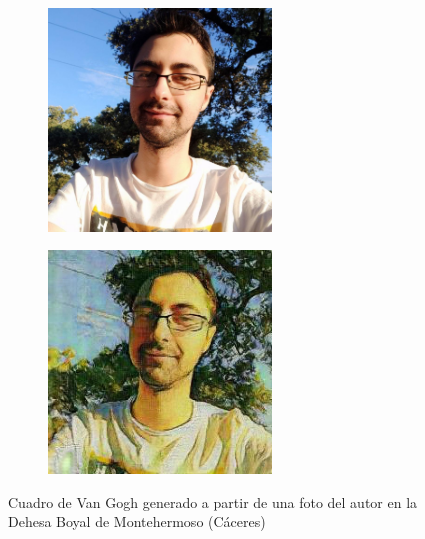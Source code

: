 \documentclass[[../main.tex]{subfiles}
\begin{document}
        \begin{figure}[!htb]
            \begin{subfigure}[b]{0.49\textwidth}
            \includegraphics[width=0.65\textwidth]{imagenes/imagen2cuadro/propias/vangogh/photo_2020-07-01_21-19-51.jpg}
            \end{subfigure}
        \hfill
            \begin{subfigure}[b]{0.49\textwidth}
            \includegraphics[width=0.65\textwidth]{imagenes/imagen2cuadro/propias/vangogh/photo_2020-07-01_21-19-51_2.jpg}
            \end{subfigure}
        \caption{Cuadro de Van Gogh generado a partir de una foto del autor en la Dehesa Boyal de Montehermoso (Cáceres)}
        \label{fig:vangogh_cuadro_dehesa}
        \end{figure}
        
\end{document}

